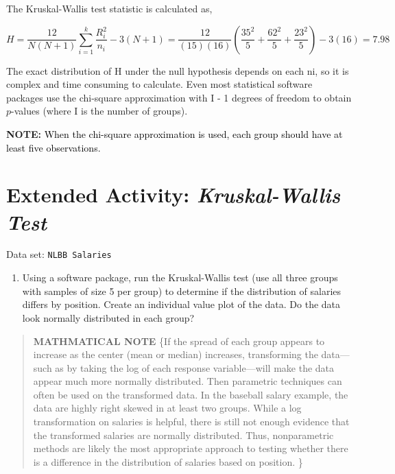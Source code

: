 \documentclass[
]{report}
\providecommand{\tightlist}{%
  \setlength{\itemsep}{0pt}\setlength{\parskip}{0pt}}
\begin{document}
The Kruskal-Wallis test statistic is calculated as,

\begin{equation} 
  H = \frac{12}{N(N + 1)} \sum_{i=1}^k \frac{R_i^2}{n_i} - 3(N + 1) = \frac{12}{(15)(16)}(\frac{35^2}{5}+\frac{62^2}{5}+\frac{23^2}{5}) -3(16) =7.98
  \tag{1.5} \label{eq:1_5}
\end{equation}

The exact distribution of H under the null hypothesis depends on each ni, so it is complex and time consuming to calculate. Even most statistical software packages use the chi-square approximation with I - 1 degrees of freedom to obtain \(p\)-values (where I is the number of groups).

\textbf{NOTE:}
\textcolor{black}{When the chi-square approximation is used, each group should have at least five observations.
}

\hypertarget{extended-activity-kruskal-wallis-test}{%
\section*{\texorpdfstring{Extended Activity: \emph{Kruskal-Wallis Test}}{Extended Activity: Kruskal-Wallis Test}}\label{extended-activity-kruskal-wallis-test}}

Data set: \texttt{NLBB\ Salaries}

\begin{enumerate}
\def\labelenumi{\arabic{enumi}.}
\setcounter{enumi}{27}
\tightlist
\item
  Using a software package, run the Kruskal-Wallis test (use all three groups with samples of size 5 per group) to determine if the distribution of salaries differs by position. Create an individual value plot of the data. Do the data look normally distributed in each group?
\end{enumerate}

\begin{quote}
\textbf{MATHMATICAL NOTE} \{If the spread of each group appears to increase as the center (mean or median) increases, transforming the data---such as by taking the log of each response variable---will make the data appear much more normally distributed. Then parametric techniques can often be used on the transformed data. In the baseball salary example, the data are highly right skewed in at least two groups. While a log transformation on salaries is helpful, there is still not enough evidence that the transformed salaries are normally distributed. Thus, nonparametric methods are likely the most appropriate approach to testing whether there is a difference in the distribution of salaries based on position.
\}
\end{quote}
\end{document}

